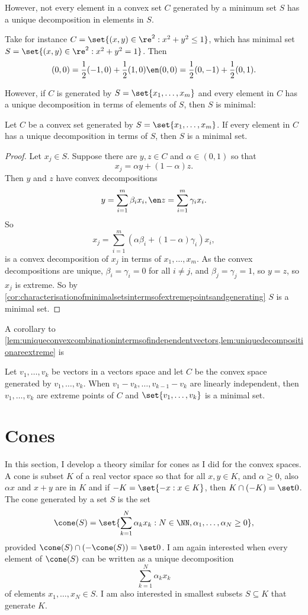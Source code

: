 \documentclass[12pt,a4paper]{article}
\begin{document}
However, not every element in a convex set $C$ generated by a minimum set $S$ has a unique decomposition in elements in $S$. 
\begin{example}
 Take for instance $C=\set{(x,y)\in\re^2:x^2+y^2\le 1}$, which has minimal set $S=\set{(x,y)\in\re^2:x^2+y^2=1}$. Then \[
	(0,0)=\frac12(-1,0)+\frac12(1,0)\en (0,0)=\frac12(0,-1)+\frac12(0,1). 
	\]
\end{example}
However, if $C$ is generated by $S=\set{x_1,\ldots,x_m}$ and every element in $C$ has a unique decomposition in terms of elements of $S$, then $S$ is minimal:
\begin{lemma}\label{lem:uniquedecompositionareextreme}
	Let $C$ be a convex set generated by $S=\set{x_1,\ldots,x_m}$. If every element in $C$ has a unique decomposition in terms of $S$, then $S$ is a minimal set. 
\end{lemma}
\begin{proof}
	Let $x_j\in S$. Suppose there are $y,z\in C$ and $\alpha\in (0,1)$ so that \[
	x_j= \alpha y + (1-\alpha)z. 
	\] 
	Then $y$ and $z$ have convex decompositions \[
	y = \sum_{i=1}^m \beta_ix_i,\en z = \sum_{i=1}^m \gamma_ix_i.
	\]
	So \[
	x_j= \sum_{i=1}^m (\alpha \beta_i+(1-\alpha)\gamma_i)x_i,
	\]
	is a convex decomposition of $x_j$ in terms of $x_1,\ldots,x_m$. 
As the convex decompositions are unique, $\beta_i=\gamma_i=0$ for all $i\neq j$, and $\beta_j=\gamma_j=1$, so $y=z$, so $x_j$ is extreme. So by \cref{cor:characterisationofminimalsetsintermsofextremepointsandgenerating} $S$ is a minimal set.  
\end{proof}


A corollary to \cref{lem:uniqueconvexcombinationintermsofindependentvectors,lem:uniquedecompositionareextreme} is 

\begin{corollary}\label{rem:uniquedecompositionbygeneratorsimpliesthatthegeneratorsareextreme}
Let $v_1,\ldots,v_k$ be vectors in a vectors space and let $C$ be the convex space generated by $v_1,\ldots,v_k$. When $v_1-v_k,\ldots,v_{k-1}-v_k$ are linearly independent, then $v_1,\ldots,v_k$ are extreme points of $C$ and $\set{v_1,\ldots,v_k}$ is a minimal set. 
\end{corollary}


\section{Cones}\label{sec:cones}


In this section, I develop a theory similar for cones as I did for the convex spaces. A cone is subset $K$ of a real vector space so that for all $x,y\in K$, and $\alpha\ge 0$, also $\alpha x$ and $x+y$ are in $K$ and if $-K=\set{-x:x\in K}$, then $K\cap (-K)=\set 0$. The cone generated by a set $S$ is the set 
\[
\cone(S)=\set{\sum_{k=1}^N \alpha_kx_k:N\in\NN, \alpha_1,\ldots,\alpha_N\ge 0},
\]
provided $\cone(S)\cap(-\cone(S))=\set 0$. I am again interested when every element of $\cone(S)$ can be written as a unique decomposition 
\[
\sum_{k=1}^N \alpha_kx_k\]
of elements $x_1,\ldots,x_N\in S$. I am also interested in smallest subsets $S\subseteq K$ that generate $K$. 
\end{document}
